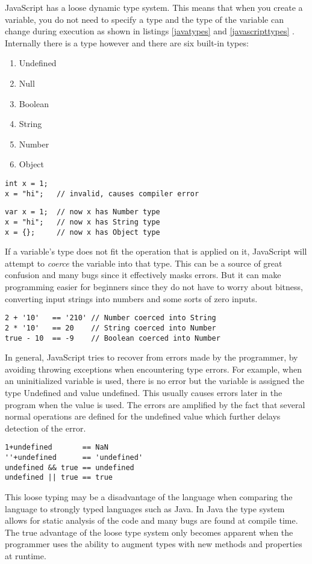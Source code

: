 JavaScript has a loose dynamic type system. This means that when you create a variable, you do not need to specify a type and the type of the variable can change during execution as shown in listings \ref{javatypes} and \ref{javascripttypes} . Internally there is a type however and there are six built-in types:
	\begin{enumerate}
	\item Undefined
	\item Null
	\item Boolean
	\item String
	\item Number
	\item Object
	\end{enumerate}
\begin{lstlisting}[caption=Changing type of variable in Java,label={javatypes}]
int x = 1;
x = "hi";   // invalid, causes compiler error
\end{lstlisting}

\begin{lstlisting}[caption=Changing type of variable in JavaScript,label={javascripttypes}]
var x = 1;  // now x has Number type
x = "hi";   // now x has String type
x = {};     // now x has Object type
\end{lstlisting}
	If a variable's type does not fit the operation that is applied on it, JavaScript will attempt to \emph{coerce} the variable into that type. This can be a source of great confusion and many bugs since it effectively masks errors. But it can make programming easier for beginners since they do not have to worry about bitness, converting input strings into numbers and some sorts of zero inputs.
\begin{lstlisting}[caption=Automatic type coercion]
2 + '10'   == '210' // Number coerced into String
2 * '10'   == 20    // String coerced into Number
true - 10  == -9    // Boolean coerced into Number
\end{lstlisting}

	In general, JavaScript tries to recover from errors made by the programmer, by avoiding throwing exceptions when encountering type errors. For example, when an uninitialized variable is used, there is no error but the variable is assigned the type Undefined and value undefined. This usually causes errors later in the program when the value is used. The errors are amplified by the fact that several normal operations are defined for the undefined value which further delays detection of the error.
\begin{lstlisting}[caption=Normal operations on undefined value]
1+undefined       == NaN
''+undefined      == 'undefined'
undefined && true == undefined
undefined || true == true
\end{lstlisting}	
This loose typing may be a disadvantage of the language when comparing the language to strongly typed languages such as Java. In Java the type system allows for static analysis of the code and many bugs are found at compile time. The true advantage of the loose type system only becomes apparent when the programmer uses the ability to augment types with new methods and properties at runtime.

